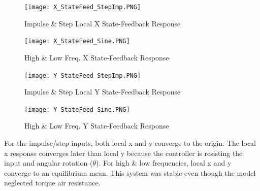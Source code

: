 \documentclass[conference]{IEEEtran}
\begin{document}
\begin{figure}[htbp]
\centering
\centerline{\texttt{[image: X\_StateFeed\_StepImp.PNG]}}
\caption{Impulse \& Step Local X State-Feedback Response}
\label{figure}
\end{figure}
\begin{figure}[htbp]
\centering
\centerline{\texttt{[image: X\_StateFeed\_Sine.PNG]}}
\caption{High \& Low Freq. X State-Feedback Response}
\label{figure}
\vspace{-5mm}
\end{figure}
\begin{figure}[htbp]
\centering
\centerline{\texttt{[image: Y\_StateFeed\_StepImp.PNG]}}
\caption{Impulse \& Step Local Y State-Feedback Response}
\label{figure}

\end{figure}

\begin{figure}[htbp]

\centering
\centerline{\texttt{[image: Y\_StateFeed\_Sine.PNG]}}
\caption{High \& Low Freq. Y State-Feedback Response}
\label{figure}
\end{figure}
\newpage
For the impulse/step inputs, both local x and y converge to the origin. The local x response converges later than local y because the controller is resisting the input and angular rotation ($\theta$). For high \& low frequencies, local x and y converge to an equilibrium mean. This system was stable even though the model neglected torque air resistance.  
\end{document}

